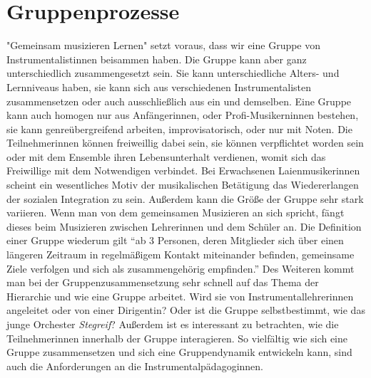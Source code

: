 \section{Gruppenprozesse}
"Gemeinsam musizieren Lernen" setzt voraus, dass wir eine Gruppe von
Instrumentalistinnen beisammen haben. Die Gruppe kann aber ganz unterschiedlich
zusammengesetzt sein. Sie kann unterschiedliche Alters- und Lernniveaus haben,
sie kann sich aus verschiedenen Instrumentalisten zusammensetzen oder auch
ausschließlich aus ein und demselben. Eine Gruppe kann auch homogen nur aus
Anfängerinnen, oder Profi-Musikerninnen bestehen, sie kann genreübergreifend arbeiten,
improvisatorisch, oder nur mit Noten. Die Teilnehmerinnen können freiweillig dabei
sein, sie können verpflichtet worden sein oder mit dem Ensemble ihren
Lebensunterhalt verdienen, womit sich das Freiwillige mit dem Notwendigen
verbindet. Bei Erwachsenen Laienmusikerinnen scheint ein wesentliches Motiv der
musikalischen Betätigung das Wiedererlangen der sozialen Integration zu sein.
Außerdem kann die Größe der Gruppe sehr stark variieren.
Wenn man von dem gemeinsamen Musizieren an sich spricht, fängt dieses beim Musizieren
zwischen Lehrerinnen und dem Schüler an. Die Definition einer Gruppe wiederum gilt
\enquote{ab 3 Personen, deren Mitglieder sich über einen längeren Zeitraum in
regelmäßigem Kontakt miteinander befinden, gemeinsame Ziele verfolgen und sich
als zusammengehörig empfinden.}
\autocite{wikipedia:gruppe}
Des Weiteren kommt man bei der Gruppenzusammensetzung sehr schnell auf das Thema
der Hierarchie und wie eine Gruppe arbeitet. Wird sie von Instrumentallehrerinnen
angeleitet oder von einer Dirigentin? Oder ist die Gruppe selbstbestimmt, wie
das junge Orchester \emph{Stegreif}? Außerdem ist es interessant zu betrachten, wie
die Teilnehmerinnen innerhalb der Gruppe interagieren. So vielfältig wie sich eine
Gruppe zusammensetzen und sich eine Gruppendynamik entwickeln kann, sind auch
die Anforderungen an die Instrumentalpädagoginnen.


